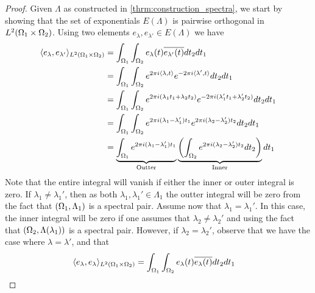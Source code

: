\documentclass[../thesis.tex]{subfiles}
\begin{document}
\begin{proof}
    Given $\Lambda$ as constructed in \cref{thrm:construction_spectra}, we start by showing that the set of exponentials $E(\Lambda)$
    is pairwise orthogonal in $L^2(\Omega_1 \times \Omega_2)$. Using two elements $e_\lambda,e_{\lambda'} \in E(\Lambda)$ we have %
    \begin{align*}
        \langle e_\lambda,e_{\lambda'}\rangle_{L^2(\Omega_1 \times \Omega_2)} 
        &= \int_{\Omega_1} \int_{\Omega_2} e_{\lambda}(t) \overline{e_{\lambda'}(t)} dt_2 dt_1\\ 
        &= \int_{\Omega_1} \int_{\Omega_2} e^{2\pi i \langle\lambda, t\rangle } e^{-2\pi i  \langle\lambda', t\rangle} dt_2 dt_1\\ 
        &= \int_{\Omega_1} \int_{\Omega_2} e^{2\pi i (\lambda_1 t_1+\lambda_2 t_2)} e^{-2\pi i(\lambda_1' t_1+\lambda_2' t_2)} dt_2 dt_1\\ 
        &= \int_{\Omega_1} \int_{\Omega_2} e^{2\pi i (\lambda_1- \lambda_1')t_1} e^{2\pi i (\lambda_2 - \lambda_2')t_2} dt_2 dt_1\\ 
        &= \underbrace{\int_{\Omega_1} e^{2\pi i  (\lambda_1- \lambda_1')t_1}}_{\text{Outter}} \underbrace{\left(\int_{\Omega_2}  e^{2\pi i (\lambda_2 - \lambda_2')t_2} dt_2\right)}_{\text{Inner}} dt_1
    \end{align*}
    Note that the entire integral will vanish if either the inner or outer integral is zero. If $\lambda_1 \neq \lambda_1'$, then as both $\lambda_1, \lambda_1' \in \Lambda_1$ the outter integral will be zero from the fact that $(\Omega_1, \Lambda_1)$ is a spectral pair. Assume now that $\lambda_1 = \lambda_1'$. In this case, the inner integral will be zero if one assumes that $\lambda_2 \neq \lambda_2'$ and using the fact that $(\Omega_2, \Lambda(\lambda_1))$ is a spectral pair. However, if $\lambda_2 = \lambda_2'$, observe that we have the case where $\lambda = \lambda'$, and that 
    \begin{align*}
        \braa{e_\lambda, e_\lambda}_{L^2\brac{\Omega_1 \times \Omega_2}}
        &= \int_{\Omega_1} \int_{\Omega_2} e_{\lambda}(t) \overline{e_{\lambda}(t)} dt_2 dt_1

\end{align*}
\end{proof}
\end{document}
